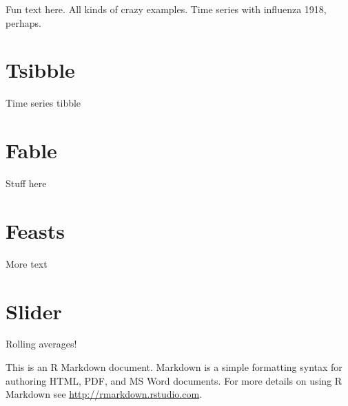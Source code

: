 \documentclass[]{book}
\begin{document}
Fun text here.
All kinds of crazy examples.
Time series with influenza 1918, perhaps.

\hypertarget{tsibble}{%
\section{Tsibble}\label{tsibble}}

Time series tibble

\hypertarget{fable}{%
\section{Fable}\label{fable}}

Stuff here

\hypertarget{feasts}{%
\section{Feasts}\label{feasts}}

More text

\hypertarget{slider}{%
\section{Slider}\label{slider}}

Rolling averages!

This is an R Markdown document. Markdown is a simple formatting syntax for authoring HTML, PDF, and MS Word documents. For more details on using R Markdown see \url{http://rmarkdown.rstudio.com}.


\end{document}
